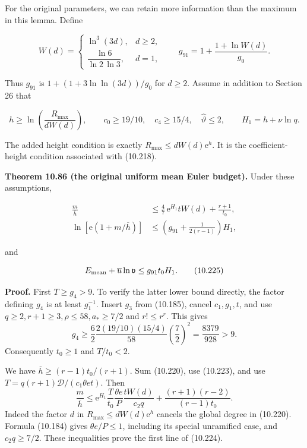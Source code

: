 \documentclass[
  11pt,
  a4paper,
]{article}
\begin{document}
For the original parameters, we can retain more information than the
maximum in this lemma. Define

\[
W(d)=\begin{cases}
\ln^3(3d),&d\ge2,\\
\dfrac{\ln6}{\ln2\,\ln3},&d=1,
\end{cases}
\qquad
g_{91}=1+\frac{1+\ln W(d)}{g_0}.
\tag{10.222}
\]

Thus \(g_{91}\) is \(1+(1+3\ln\ln(3d))/g_0\) for \(d\ge2\). Assume in
addition to Section 26 that

\[
h\ge\ln\!\left(\frac{R_{\max}}{dW(d)}\right),
\qquad c_0\ge19/10,\quad c_4\ge15/4,\quad
\widehat\vartheta\le2,
\qquad H_1=h+\nu\ln q.
\tag{10.223}
\]

The added height condition is exactly \(R_{\max}\le dW(d)\mathrm e^h\).
It is the coefficient-height condition associated with (10.218).

\textbf{Theorem 10.86 (the original uniform mean Euler budget).} Under
these assumptions,

\[
\begin{aligned}
\frac m{\overline h}
&\le\frac47\,\mathrm e^{H_1}tW(d)+\frac{r+1}{t_0},\\
\ln\!\left[\mathrm e(1+m/\overline h)\right]
&\le\left(g_{91}+\frac1{2(r-1)}\right)H_1,
\end{aligned}
\tag{10.224}
\]

and

\[
E_{\rm mean}+\overline u\ln\mathfrak v
\le g_{91}t_0H_1.
\tag{10.225}
\]

\textbf{Proof.} First \(T\ge g_4>9\). To verify the latter lower bound
directly, the factor defining \(g_4\) is at least \(g_1^{-1}\). Insert
\(g_3\) from (10.185), cancel \(c_1,g_1,t\), and use
\(q\ge2,r+1\ge3,\rho\le58,a_*\ge7/2\) and \(r!\le r^r\). This gives \[
g_4\ge\frac62\frac{2(19/10)(15/4)}{58}
                 \left(\frac72\right)^2
=\frac{8379}{928}>9.
\] Consequently \(t_0\ge1\) and \(T/t_0<2\).

We have \(\overline h\ge(r-1)t_0/(r+1)\). Sum (10.220), use (10.223),
and use \(T=q(r+1)\mathcal D/(c_1\theta et)\). Then \[
\frac m{\overline h}
\le\mathrm e^{H_1}\frac{T}{t_0}
       \frac{\theta e}{P}\frac{tW(d)}{c_2q}+
       \frac{(r+1)(r-2)}{(r-1)t_0}.
\] Indeed the factor \(d\) in \(R_{\max}\le dW(d)\mathrm e^h\) cancels
the global degree in (10.220). Formula (10.184) gives
\(\theta e/P\le1\), including its special unramified case, and
\(c_2q\ge7/2\). These inequalities prove the first line of (10.224).
\end{document}
